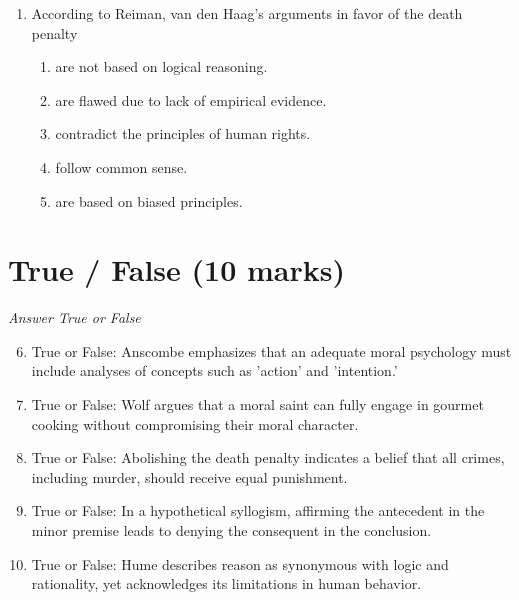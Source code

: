 \documentclass[12pt]{article}
\begin{document}
\begin{enumerate}[label=\arabic*.]
\begin{enumerate}[label=(\alph*)]
    \item should primarily focus on preserving the natural environment.
    \item must align with societal norms and expectations.
    \item are based solely on religious doctrines.
\end{enumerate}
\item According to Reiman, van den Haag's arguments in favor of the death penalty
\begin{enumerate}[label=(\alph*)]
    \item are not based on logical reasoning.
    \item are flawed due to lack of empirical evidence.
    \item contradict the principles of human rights.
    \item follow common sense.
    \item are based on biased principles.
\end{enumerate}
\end{enumerate}

\section*{True / False (10 marks)}
\textit{Answer True or False}
\begin{enumerate}[label=\arabic*.]
\setcounter{enumi}{5}
\item True or False: Anscombe emphasizes that an adequate moral psychology must include analyses of concepts such as 'action' and 'intention.'
\item True or False: Wolf argues that a moral saint can fully engage in gourmet cooking without compromising their moral character.
\item True or False: Abolishing the death penalty indicates a belief that all crimes, including murder, should receive equal punishment.
\item True or False: In a hypothetical syllogism, affirming the antecedent in the minor premise leads to denying the consequent in the conclusion.
\item True or False: Hume describes reason as synonymous with logic and rationality, yet acknowledges its limitations in human behavior.
\end{enumerate}
\end{document}
